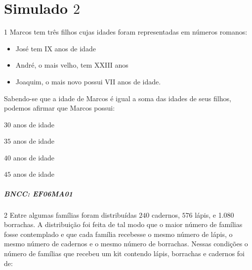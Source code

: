 \chapter{Simulado $2$}

\num{1}  Marcos tem três filhos cujas idades foram representadas em números
romanos:

\begin{itemize}
\item
  José tem IX anos de idade
\item
  André, o mais velho, tem XXIII anos
\item
  Joaquim, o mais novo possui VII anos de idade.
\end{itemize}

Sabendo-se que a idade de Marcos é igual a soma das idades de seus
filhos, podemos afirmar que Marcos possui:

\begin{escolha}
\item $30$ anos de idade
\item $35$ anos de idade
\item $40$ anos de idade
\item $45$ anos de idade
\end{escolha}

\paragraph{BNCC: EF06MA01 }


\num{2}  Entre algumas famílias foram distribuídas $240$ cadernos, $576$ lápis, e
1.080 borrachas. A distribuição foi feita de tal modo que o maior número
de famílias fosse contemplado e que cada família recebesse o mesmo
número de lápis, o mesmo número de cadernos e o mesmo número de
borrachas. Nessas condições o número de famílias que recebeu um kit
contendo lápis, borrachas e cadernos foi de:

